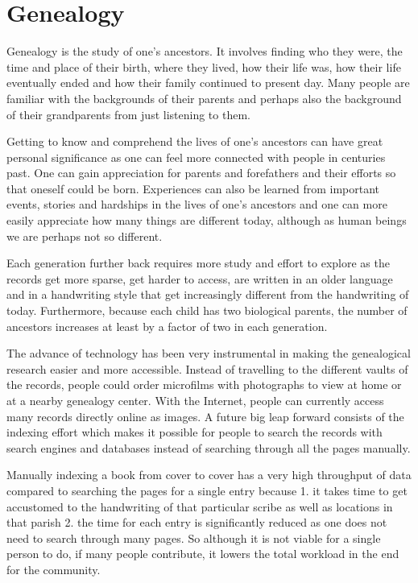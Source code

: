 
\section{Genealogy}

Genealogy is the study of one's ancestors. It involves finding who they were, the time and place of their birth, where they lived, how their life was, how their life eventually ended and how their family continued to present day. Many people are familiar with the backgrounds of their parents and perhaps also the background of their grandparents from just listening to them.

Getting to know and comprehend the lives of one's ancestors can have great personal significance as one can feel more connected with people in centuries past. One can gain appreciation for parents and forefathers and their efforts so that oneself could be born.
Experiences can also be learned from important events, stories and hardships in the lives of one's ancestors and one can more easily appreciate how many things are different today, although as human beings we are perhaps not 
so different.


Each generation further back requires more study and effort to explore as the records get more sparse, get harder to access, are written in an older language and in a handwriting style that get increasingly different from the handwriting of today. Furthermore, because each child has two biological parents, the number of ancestors increases at least by a factor of two in each generation.

The advance of technology has been very instrumental in making the genealogical research easier and more accessible. Instead of travelling to the different vaults of the records, people could order microfilms with photographs to view at home or at a nearby genealogy center. With the Internet, people can currently access many records directly online as images. A future big leap forward consists of the indexing effort which makes it possible for people to search the records with search engines and databases instead of searching through all the pages manually.

Manually indexing a book from cover to cover has a very high throughput of data compared to searching the pages for a single entry because 1. it takes time to get accustomed to the handwriting of that particular scribe as well as locations in that parish 2. the time for each entry is significantly reduced as one does not need to search through many pages. So although it is not viable for a single person to do, if many people contribute, it lowers the total workload in the end for the community.

